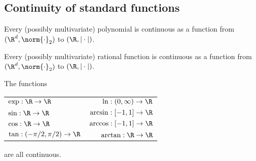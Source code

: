 \subsection{Continuity of standard functions}
\begin{proposition}
    Every (possibly multivariate) polynomial is continuous as a function from $(\R^d, \norm{\cdot}_2)$ to $(\R,|\cdot|)$.
\end{proposition}
\begin{proposition}
    Every (possibly multivariate) rational function is continuous as a function from $(\R^d, \norm{\cdot}_2)$ to $(\R,|\cdot|)$.
\end{proposition}

\begin{proposition}
    The functions
    \begin{center}
        \begin{tabular}{l r}
            $\exp:\R \to \R$ & $\ln: (0,\infty)\to\R$ \\
            $\sin:\R \to \R$ & $\arcsin:[-1,1] \to \R$ \\
            $\cos:\R \to \R$ & $\arccos:[-1,1] \to \R$ \\
            $\tan:(-\pi/2,\pi/2) \to \R$ & $\arctan:\R \to \R$
        \end{tabular}
    \end{center}
    are all continuous.
\end{proposition}

